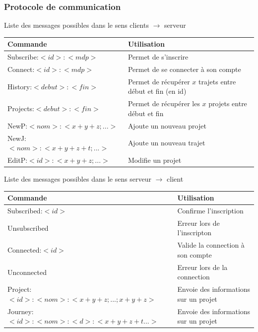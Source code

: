 \subsubsection{Protocole de communication}
    \begin{center}
        Liste des messages possibles dans le sens clients $\rightarrow$ serveur
        \par
        \begin{tabular}{|l|l|}
            \hline
            Commande & Utilisation\\
            \hline
            Subscribe:$<id>:<mdp>$ & Permet de s'inscrire\\
            \hline
            Connect:$<id>:<mdp>$ & Permet de se connecter à son compte\\
            \hline
            \hline
            History:$<debut>:<fin>$ & Permet de récupérer $x$ trajets entre début et fin (en id)\\
            \hline
            Projects:$<debut>:<fin>$ & Permet de récupérer les $x$ projets entre début et fin\\
            \hline
            \hline
            NewP:$<nom>:<x+y+z;...>$ & Ajoute un nouveau projet\\
            \hline
            NewJ:$<nom>:<x+y+z+t;...>$ & Ajoute un nouveau trajet\\
            \hline
            EditP:$<id>:<x+y+z;...>$ & Modifie un projet\\
            \hline
        \end{tabular}
    \end{center}
    \begin{center}
        Liste des messages possibles dans le sens serveur $\rightarrow$ client
        \par
        \begin{tabular}{|l|l|}
            \hline
            Commande & Utilisation\\
            \hline
            Subscribed:$<id>$ & Confirme l'inscription \\
            \hline
            Unsubscribed & Erreur lors de l'inscripton \\
            \hline
            Connected:$<id>$ & Valide la connection à son compte\\
            \hline
            Unconnected & Erreur lors de la connection \\
            \hline
            \hline
            Project:$<id>:<nom>:<x+y+z;...;x+y+z>$ & Envoie des informations sur un projet\\
            \hline
            Journey:$<id>:<nom>:<d>:<x+y+z+t...>$ & Envoie des informations sur un projet\\
            \hline
        \end{tabular}
    \end{center}


